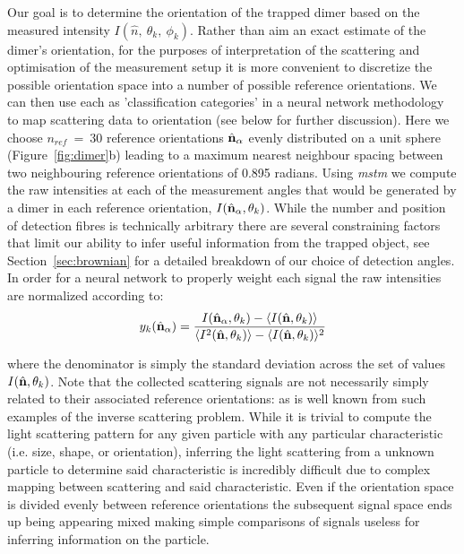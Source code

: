 Our goal is to determine the orientation of the trapped dimer 
based on the measured intensity $I(\hat{n}, \ \theta_k,\ \phi_k)$. 
Rather than aim an exact estimate of the dimer's orientation, 
for the purposes of interpretation of the scattering and 
optimisation of the measurement setup it is more convenient 
to discretize the possible orientation space into a number 
of possible reference orientations. We can then use each as 
'classification categories' in a neural network methodology 
to map scattering data to orientation (see below for further 
discussion). Here we choose $\textit{n}_{ref} \ = \ 30$ 
reference orientations $\hat{\bf n}_{\alpha}$  evenly 
distributed on a unit sphere \cite{Reyuthor2006} 
(Figure~\ref{fig:dimer}b) leading to a maximum nearest 
neighbour spacing between two neighbouring reference 
orientations of 0.895 radians. Using \textit{mstm} we 
compute the raw intensities at each of the measurement angles 
that would be generated by a dimer in each reference 
orientation, $I(\hat{\bf n}_{\alpha}, \theta_k)$. While the 
number and position of detection fibres is technically arbitrary 
there are several constraining factors that limit our ability 
to infer useful information from the trapped object, see Section~\ref{sec:brownian} for a detailed breakdown of our 
choice of detection angles. In order for a neural network
to properly weight each signal the raw intensities are 
normalized according to:
\begin{align}
	\label{eq:scale}
	y_k(\hat{\bf n}_\alpha)
	= 
	\frac{I(\hat{\bf n}_\alpha, \theta_k) - \langle I(\hat{\bf n},\theta_k) \rangle } 
	{\langle I^2(\hat{\bf n},\theta_k) \rangle -\langle I(\hat{\bf n}, \theta_k)\rangle^2}
\end{align}

where the denominator is simply the standard deviation across 
the set of values $I(\hat{\bf n}, \theta_k)$. Note that the 
collected scattering signals are not necessarily simply 
related to their associated reference orientations: as is well 
known from such examples of the inverse scattering problem. 
While it is trivial to compute the light scattering pattern 
for any given particle with any particular characteristic (i.e. 
size, shape, or orientation), inferring the light scattering 
from a unknown particle to determine said characteristic is 
incredibly difficult due to complex mapping between scattering 
and said characteristic. Even if the orientation space is 
divided evenly between reference orientations the subsequent 
signal space ends up being appearing mixed making simple 
comparisons of signals useless for inferring information on the 
particle. 

